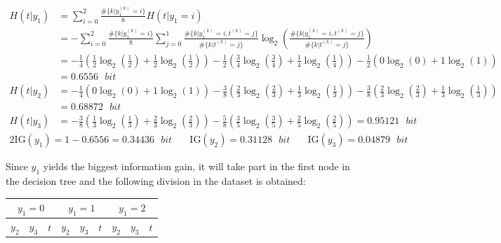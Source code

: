 \documentclass{exam}
\begin{document}
\begin{questions}
\begin{itemize}
            \begin{align*}
                H(t|y_1) &= \sum_{i = 0}^{2} \frac{\#\{k|y_1^{(k)} = i\}}{8}H(t|y_1 = i)\\
                &= - \sum_{i = 0}^{2} \frac{\#\{k|y_1^{(k)} = i\}}{8} \sum_{j = 0}^{1} \frac{\#\{k|y_1^{(k)} = i, t^{(k)} = j\}}{\#\{k|t^{(k)} = j\}} \log_2\left( \frac{\#\{k|y_1^{(k)} = i, t^{(k)} = j\}}{\#\{k|t^{(k)} = j\}}\right) \\
                &= - \frac{1}{4}\left( \frac{1}{2}\log_2\left(\frac{1}{2}\right) + \frac{1}{2}\log_2\left(\frac{1}{2}\right)\right) - \frac{1}{2} \left( \frac{3}{4}\log_2\left(\frac{3}{4}\right) + \frac{1}{4}\log_2\left(\frac{1}{4}\right)\right) - \frac{1}{2} \left( 0\log_2\left(0\right) + 1\log_2(1)\right) \\
                &= 0.6556  \text{ }bit\\
                H(t|y_2) &= - \frac{1}{4}\left(0\log_2(0) + 1\log_2(1)\right) - \frac{3}{8} \left( \frac{2}{3}\log_2\left(\frac{2}{3}\right) + \frac{1}{3}\log_2\left(\frac{1}{3}\right)\right) - \frac{3}{8} \left( \frac{2}{3}\log_2\left(\frac{2}{3}\right) + \frac{1}{3}\log_2\left(\frac{1}{3}\right)\right) \\
                &= 0.68872  \text{ }bit\\
                H(t|y_3) &= - \frac{3}{8}\left(\frac{1}{3}\log_2\left(\frac{1}{3}\right) + \frac{2}{3}\log_2\left(\frac{2}{3}\right)\right) - \frac{5}{8} \left( \frac{3}{5}\log_2\left(\frac{3}{5}\right) + \frac{2}{5}\log_2\left(\frac{2}{5}\right)\right) = 0.95121 \text{ }bit
            \end{align*}
            \begin{alignat*}{2}
                \text{IG}(y_1) = 1 - 0.6556  = 0.34436 \text{ }bit \quad & \text{IG}(y_2) = 0.31128 \text{ }bit \quad & \text{IG}(y_3) = 0.04879 \text{ }bit
            \end{alignat*}
        \end{itemize}
        Since $y_1$ yields the biggest information gain, it will take part in the first node in the decision tree and the following division in the dataset is obtained:
        \begin{table}[H]
            \centering
            \begin{tabular}{lll|lll|lll}
            \multicolumn{3}{c|}{$y_1  = 0$} & \multicolumn{3}{c|}{$y_1 = 1$} & \multicolumn{3}{c}{$y_1 = 2$} \\ \hline
            $y_2$     & $y_3$     & $t$    & $y_2$     & $y_3$     & $t$    & $y_2$     & $y_3$     & $t$    \\ \hline

\end{tabular}
\end{table}
\end{questions}
\end{document}
